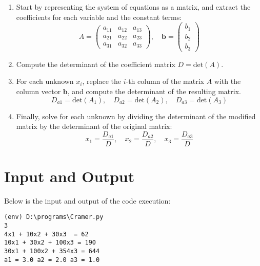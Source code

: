 \documentclass[12pt]{article}
\begin{document}
            \begin{enumerate}
                \item Start by representing the system of equations as a matrix, and extract the coefficients for each variable and the constant terms:
        \[
            A = 
            \begin{pmatrix}
                a_{11} & a_{12} & a_{13} \\
                a_{21} & a_{22} & a_{23} \\
                a_{31} & a_{32} & a_{33}
            \end{pmatrix}, \quad
            \mathbf{b} = 
            \begin{pmatrix}
                b_1 \\
                b_2 \\
                b_3
            \end{pmatrix}
            \]
            
            \item Compute the determinant of the coefficient matrix \( D = \text{det}(A) \).
            
            \item For each unknown \( x_i \), replace the \( i \)-th column of the matrix \( A \) with the column vector \( \mathbf{b} \), and compute the determinant of the resulting matrix.
            \[
                D_{a1} = \text{det}(A_1), \quad D_{a2} = \text{det}(A_2), \quad D_{a3} = \text{det}(A_3)
                \]

        \item Finally, solve for each unknown by dividing the determinant of the modified matrix by the determinant of the original matrix:
        \[
            x_1 = \frac{D_{a1}}{D}, \quad x_2 = \frac{D_{a2}}{D}, \quad x_3 = \frac{D_{a3}}{D}
            \]
        \end{enumerate}
        
            
            
            \section*{Input and Output}
            \noindent Below is the input and output of the code execution:
     
            {\small
            \begin{verbatim}
(env) D:\programs\Cramer.py
3
4x1 + 10x2 + 30x3  = 62
10x1 + 30x2 + 100x3 = 190
30x1 + 100x2 + 354x3 = 644
a1 = 3.0 a2 = 2.0 a3 = 1.0
            \end{verbatim}
            }
\end{document}
